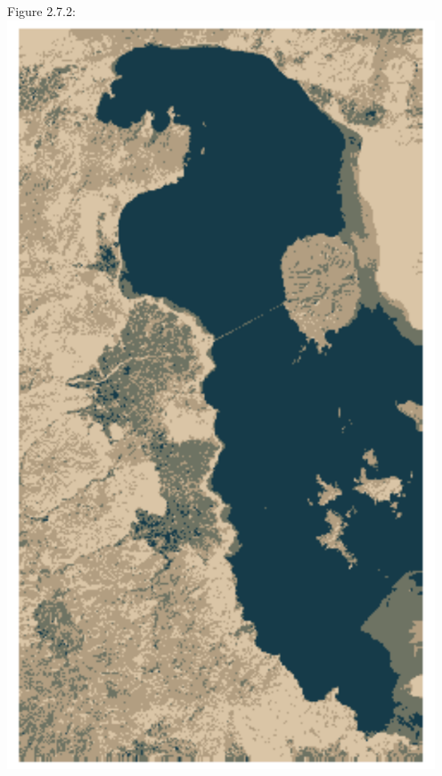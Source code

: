 \documentclass[12pt]{article}
\begin{document}
\begin{center}
  Figure 2.7.2:\\
  \includegraphics[width=5in]{plots/km_plot9.png}\\


\end{center}
\end{document}
